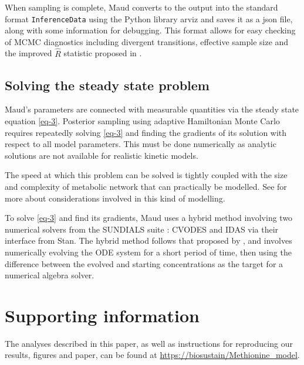 \documentclass[journal=asbcd6,manuscript=article,layout=traditional]{achemso}
\begin{document}
When sampling is complete, Maud converts to the output into the standard
format \texttt{InferenceData} using the Python library arviz
\citep{kumarArviZUnifiedLibrary2019} and saves it as a json file, along
with some information for debugging. This format allows for easy
checking of MCMC diagnostics including divergent transitions, effective
sample size and the improved \(\hat{R}\) statistic proposed in
\citet{vehtariRankNormalizationFoldingLocalization2021}.

\hypertarget{solving-the-steady-state-problem}{%
\subsection{Solving the steady state
problem}\label{solving-the-steady-state-problem}}

Maud's parameters are connected with measurable quantities via the
steady state equation \eqref{eq-3}. Posterior sampling using adaptive
Hamiltonian Monte Carlo requires repeatedly solving \eqref{eq-3} and
finding the gradients of its solution with respect to all model
parameters. This must be done numerically as analytic solutions are not
available for realistic kinetic models.

The speed at which this problem can be solved is tightly coupled with
the size and complexity of metabolic network that can practically be
modelled. See \citet{timonenImportanceSamplingApproach2022a} for more
about considerations involved in this kind of modelling.

To solve \eqref{eq-3} and find its gradients, Maud uses a hybrid method
involving two numerical solvers from the SUNDIALS suite
\citep{serbanCVODESSensitivityEnabledODE2005}: CVODES and IDAS via their
interface from Stan. The hybrid method follows that proposed by
\citet{margossianComputingSteadyStates2018}, and involves numerically
evolving the ODE system for a short period of time, then using the
difference between the evolved and starting concentrations as the target
for a numerical algebra solver.

\hypertarget{supporting-information}{%
\section{Supporting information}\label{supporting-information}}

The analyses described in this paper, as well as instructions for
reproducing our results, figures and paper, can be found at
\url{https://biosustain/Methionine_model}.
\end{document}
